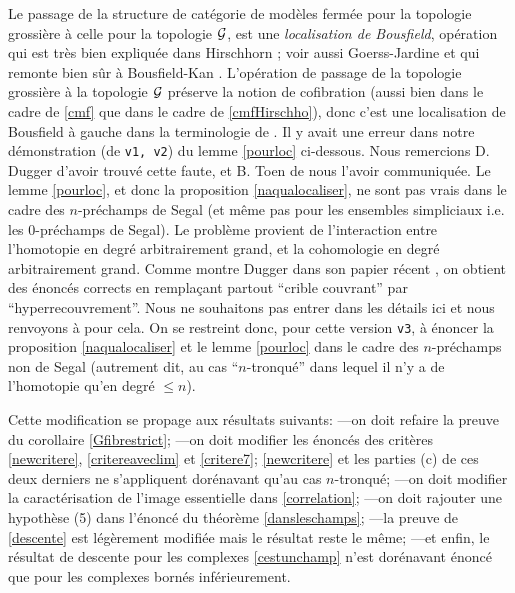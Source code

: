\documentclass[12pt]{article}
\newcommand{\Gg}{{\cal G}}
\begin{document}
Le passage de la structure de cat\'egorie de mod\`eles
ferm\'ee pour la topologie grossi\`ere \`a celle pour la topologie $\Gg$,
est une {\em localisation de Bousfield}, op\'eration qui est
tr\`es bien expliqu\'ee dans Hirschhorn \cite{Hirschhorn}; voir aussi
Goerss-Jardine \cite{JardineGoerssLoc} et qui remonte bien s\^ur \`a
Bousfield-Kan \cite{BousfieldKan}. L'op\'eration de passage de la topologie
grossi\`ere \`a la topologie $\Gg$ pr\'eserve la notion
de cofibration (aussi bien dans le cadre de \ref{cmf} que dans le cadre de
\ref{cmfHirschho}), donc  c'est une localisation de Bousfield \`a gauche
dans la terminologie de \cite{Hirschhorn}.
Il y avait une erreur dans notre d\'emonstration (de {\tt v1, v2}) 
du lemme \ref{pourloc} ci-dessous. Nous remercions D. Dugger d'avoir trouv\'e 
cette faute, et B. Toen de nous l'avoir communiqu\'ee. Le lemme \ref{pourloc},
et donc la proposition \ref{naqualocaliser}, ne sont pas vrais dans
le cadre des $n$-pr\'echamps de Segal (et m\^eme pas pour les ensembles
simpliciaux i.e. les $0$-pr\'echamps de Segal). Le probl\`eme
provient de l'interaction entre l'homotopie en degr\'e arbitrairement grand,
et la cohomologie en degr\'e arbitrairement grand. Comme montre Dugger dans son
papier r\'ecent \cite{Dugger}, on obtient des \'enonc\'es corrects en 
rempla\c{c}ant
partout ``crible couvrant'' par ``hyperrecouvrement''. Nous ne souhaitons  pas
entrer dans les d\'etails ici et nous renvoyons \`a \cite{Dugger} pour cela.
On se restreint donc, pour cette version {\tt v3}, \`a \'enoncer la proposition
\ref{naqualocaliser} et le lemme \ref{pourloc} dans le cadre des $n$-pr\'echamps
non de Segal (autrement dit, au cas ``$n$-tronqu\'e'' dans lequel il n'y a de
l'homotopie qu'en degr\'e $\leq n$).

Cette modification se propage aux r\'esultats suivants: 
\newline
---on doit refaire la preuve du corollaire \ref{Gfibrestrict};
\newline
---on doit modifier les \'enonc\'es des crit\`eres 
\ref{newcritere}, \ref{critereaveclim} et \ref{critere7};
\ref{newcritere} et les parties (c) de ces deux derniers 
ne s'appliquent dor\'enavant qu'au cas $n$-tronqu\'e;
\newline
---on doit modifier la caract\'erisation de l'image essentielle
dans \ref{correlation};
\newline
---on doit rajouter une hypoth\`ese (5) dans l'\'enonc\'e du th\'eor\`eme
\ref{dansleschamps};
\newline
---la preuve de \ref{descente} est l\'eg\`erement modifi\'ee mais le r\'esultat
reste le m\^eme;
\newline
---et enfin, le r\'esultat de descente pour les complexes \ref{cestunchamp}
n'est dor\'enavant \'enonc\'e que pour les complexes born\'es inf\'erieurement.
\end{document}
